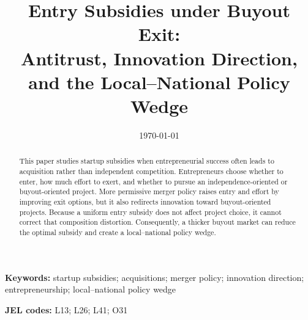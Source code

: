 \documentclass[11pt]{article}
\title{Entry Subsidies under Buyout Exit:\\
Antitrust, Innovation Direction, and the Local--National Policy Wedge}
\date{\today}
\theoremstyle{plain}
\theoremstyle{remark}
\begin{document}
\maketitle

\begin{abstract}
This paper studies startup subsidies when entrepreneurial success often leads to acquisition rather than independent competition. Entrepreneurs choose whether to enter, how much effort to exert, and whether to pursue an independence-oriented or buyout-oriented project. More permissive merger policy raises entry and effort by improving exit options, but it also redirects innovation toward buyout-oriented projects. Because a uniform entry subsidy does not affect project choice, it cannot correct that composition distortion. Consequently, a thicker buyout market can reduce the optimal subsidy and create a local--national policy wedge.
\end{abstract}

\noindent
\textbf{Keywords:} startup subsidies; acquisitions; merger policy; innovation direction; entrepreneurship; local--national policy wedge

\noindent
\textbf{JEL codes:} L13; L26; L41; O31

\newpage










\appendix








\end{document}

